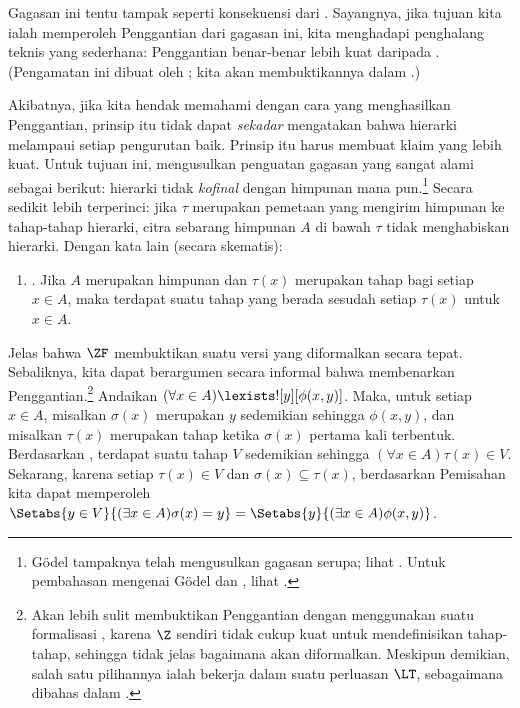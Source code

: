\documentclass[../../../include/open-logic-section]{subfiles}
\begin{document}
Gagasan ini tentu tampak seperti konsekuensi dari \stagesinex. Sayangnya,
jika tujuan kita ialah memperoleh Penggantian dari gagasan ini, kita
menghadapi penghalang teknis yang sederhana: Penggantian benar-benar lebih
kuat daripada .
(Pengamatan ini dibuat oleh \citet[\S13.2]{Potter2004}; kita akan
membuktikannya dalam
.)

Akibatnya, jika kita hendak memahami \stagesinex{} dengan cara yang
menghasilkan Penggantian, prinsip itu tidak dapat \emph{sekadar} mengatakan
bahwa hierarki melampaui setiap pengurutan baik. Prinsip itu harus membuat
klaim yang lebih kuat. Untuk tujuan ini, \cite{Shoenfield:AST} mengusulkan
penguatan gagasan yang sangat alami sebagai berikut: hierarki tidak
\emph{kofinal} dengan himpunan mana pun.\footnote{G\"odel tampaknya telah
mengusulkan gagasan serupa; lihat \citet[p.~223]{Potter2004}. Untuk
pembahasan mengenai G\"odel dan \citeauthor{Shoenfield:AST}, lihat
\citet[90--5]{Incurvati2020}.} Secara sedikit lebih terperinci: jika $\tau$
merupakan pemetaan yang mengirim himpunan ke tahap-tahap hierarki, citra
sebarang himpunan $A$ di bawah $\tau$ tidak menghabiskan hierarki. Dengan
kata lain (secara skematis):
\begin{enumerate}
	\item[] \stagescofin. Jika $A$ merupakan himpunan dan $\tau(x)$ merupakan
	tahap bagi setiap $x \in A$, maka terdapat suatu tahap yang berada sesudah
	setiap $\tau(x)$ untuk $x \in A$.
\end{enumerate}
Jelas bahwa $\ZF$ membuktikan suatu versi \stagescofin{} yang diformalkan
secara tepat. Sebaliknya, kita dapat berargumen secara informal bahwa
\stagescofin{} membenarkan Penggantian.\footnote{Akan lebih sulit
membuktikan Penggantian dengan menggunakan suatu formalisasi
\stagescofin, karena $\Z$ sendiri tidak cukup kuat untuk mendefinisikan
tahap-tahap, sehingga tidak jelas bagaimana \stagescofin{} akan
diformalkan. Meskipun demikian, salah satu pilihannya ialah bekerja dalam
suatu perluasan $\LT$, sebagaimana dibahas dalam
.} Andaikan
$(\forall x \in A)\lexists![y][\phi(x,y)]$. Maka, untuk setiap $x \in A$,
misalkan $\sigma(x)$ merupakan $y$ sedemikian sehingga $\phi(x,y)$, dan
misalkan $\tau(x)$ merupakan tahap ketika $\sigma(x)$ pertama kali terbentuk.
Berdasarkan \stagescofin, terdapat suatu tahap $V$ sedemikian sehingga
$(\forall x \in A)\tau(x)\in V$. Sekarang, karena setiap
$\tau(x) \in V$ dan $\sigma(x) \subseteq \tau(x)$, berdasarkan Pemisahan
kita dapat memperoleh
$\Setabs{y \in V}{(\exists x \in A)\sigma(x) = y} = \Setabs{y}{(\exists x \in A)\phi(x,y)}$.
\end{document}
